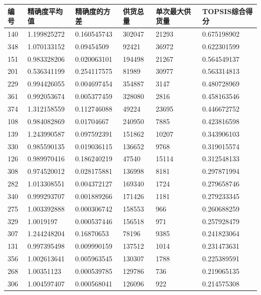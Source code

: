 \documentclass{cumcmthesis}
\begin{document}
    \begin{longtable}{l|llll|l}
        \toprule

    编号  & 精确度平均值 & 精确度的方差  & 供货总量   & 单次最大供货量 & TOPSIS综合得分  \\
    \midrule
    140 & 1.199825272 & 0.160545743 & 302047 & 21293   & 0.675198902 \\
    348 & 1.070133152 & 0.09454509  & 92421  & 36972   & 0.622301599 \\
    151 & 0.983328206 & 0.020063101 & 194498 & 21267   & 0.564549137 \\
    201 & 0.536341199 & 0.254117575 & 81989  & 30977   & 0.563314813 \\
    229 & 0.994426055 & 0.004697454 & 354887 & 3147    & 0.480728969 \\
    361 & 0.992053674 & 0.005377459 & 328080 & 2816    & 0.458163546 \\
    374 & 1.312158559 & 0.112746088 & 49224  & 23695   & 0.446672752 \\
    108 & 0.984082869 & 0.01704667  & 240950 & 7885    & 0.423816598 \\
    139 & 1.243990587 & 0.097592391 & 151862 & 10207   & 0.343906103 \\
    330 & 0.985590135 & 0.019036115 & 136652 & 9768    & 0.319015574 \\
    126 & 0.989970416 & 0.186240219 & 47540  & 15114   & 0.312548133 \\
    308 & 0.974520012 & 0.028175881 & 136998 & 8181    & 0.297871994 \\
    282 & 1.013308551 & 0.004372127 & 169340 & 1724    & 0.279658746 \\
    340 & 0.999293707 & 0.001889266 & 171426 & 1181    & 0.279233345 \\
    275 & 1.003392888 & 0.000306742 & 158553 & 966     & 0.260688259 \\
    329 & 1.0019197   & 0.000537446 & 156518 & 971     & 0.257928479 \\
    307 & 1.244248204 & 0.16870653  & 78196  & 9385    & 0.241823064 \\
    131 & 0.997395498 & 0.009990159 & 137512 & 1014    & 0.231473631 \\
    356 & 1.002613641 & 0.005963545 & 130307 & 1788    & 0.225389591 \\
    268 & 1.00351123  & 0.000539785 & 129786 & 736     & 0.219065135 \\
    306 & 1.004597407 & 0.000568041 & 126096 & 922     & 0.214575308 \\

\end{longtable}
\end{document}
